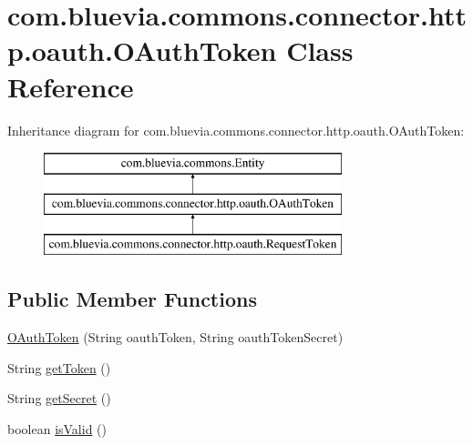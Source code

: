 \hypertarget{classcom_1_1bluevia_1_1commons_1_1connector_1_1http_1_1oauth_1_1OAuthToken}{
\section{com.bluevia.commons.connector.http.oauth.OAuthToken Class Reference}
\label{classcom_1_1bluevia_1_1commons_1_1connector_1_1http_1_1oauth_1_1OAuthToken}
}
Inheritance diagram for com.bluevia.commons.connector.http.oauth.OAuthToken:\begin{figure}[H]
\begin{center}
\leavevmode
\includegraphics[height=3.000000cm]{classcom_1_1bluevia_1_1commons_1_1connector_1_1http_1_1oauth_1_1OAuthToken}
\end{center}
\end{figure}
\subsection*{Public Member Functions}
\begin{DoxyCompactItemize}
\item 
\hyperlink{classcom_1_1bluevia_1_1commons_1_1connector_1_1http_1_1oauth_1_1OAuthToken_a8df95d8744e6ab7754c89856b83d75b2}{OAuthToken} (String oauthToken, String oauthTokenSecret)
\item 
String \hyperlink{classcom_1_1bluevia_1_1commons_1_1connector_1_1http_1_1oauth_1_1OAuthToken_a12fa1682e1c215e20e379949855a0db4}{getToken} ()
\item 
String \hyperlink{classcom_1_1bluevia_1_1commons_1_1connector_1_1http_1_1oauth_1_1OAuthToken_ac8abbbd3805a559e082ea6ffa3501b89}{getSecret} ()
\item 
boolean \hyperlink{classcom_1_1bluevia_1_1commons_1_1connector_1_1http_1_1oauth_1_1OAuthToken_adc8699405a3f177aab54f52b193e24a3}{isValid} ()
\end{DoxyCompactItemize}
